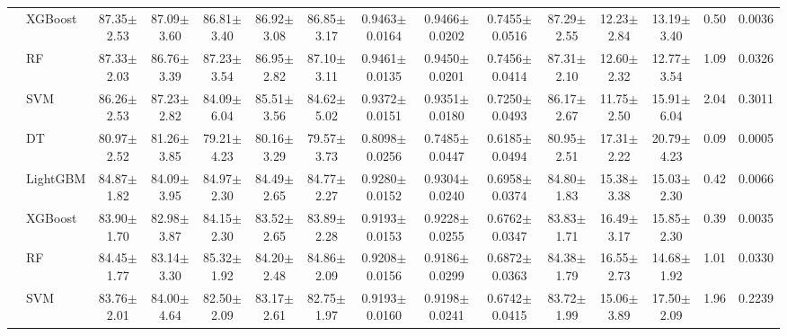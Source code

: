 \begin{tabular}{@{}llccccccccccccc@{}}
 & XGBoost & 87.35{\tiny$\pm$2.53} & 87.09{\tiny$\pm$3.60} & 86.81{\tiny$\pm$3.40} & 86.92{\tiny$\pm$3.08} & 86.85{\tiny$\pm$3.17} & 0.9463{\tiny$\pm$0.0164} & 0.9466{\tiny$\pm$0.0202} & 0.7455{\tiny$\pm$0.0516} & 87.29{\tiny$\pm$2.55} & 12.23{\tiny$\pm$2.84} & 13.19{\tiny$\pm$3.40} & 0.50 & 0.0036\\
 & RF & 87.33{\tiny$\pm$2.03} & 86.76{\tiny$\pm$3.39} & 87.23{\tiny$\pm$3.54} & 86.95{\tiny$\pm$2.82} & 87.10{\tiny$\pm$3.11} & 0.9461{\tiny$\pm$0.0135} & 0.9450{\tiny$\pm$0.0201} & 0.7456{\tiny$\pm$0.0414} & 87.31{\tiny$\pm$2.10} & 12.60{\tiny$\pm$2.32} & 12.77{\tiny$\pm$3.54} & 1.09 & 0.0326\\
 & SVM & 86.26{\tiny$\pm$2.53} & 87.23{\tiny$\pm$2.82} & 84.09{\tiny$\pm$6.04} & 85.51{\tiny$\pm$3.56} & 84.62{\tiny$\pm$5.02} & 0.9372{\tiny$\pm$0.0151} & 0.9351{\tiny$\pm$0.0180} & 0.7250{\tiny$\pm$0.0493} & 86.17{\tiny$\pm$2.67} & 11.75{\tiny$\pm$2.50} & 15.91{\tiny$\pm$6.04} & 2.04 & 0.3011\\
 & DT & 80.97{\tiny$\pm$2.52} & 81.26{\tiny$\pm$3.85} & 79.21{\tiny$\pm$4.23} & 80.16{\tiny$\pm$3.29} & 79.57{\tiny$\pm$3.73} & 0.8098{\tiny$\pm$0.0256} & 0.7485{\tiny$\pm$0.0447} & 0.6185{\tiny$\pm$0.0494} & 80.95{\tiny$\pm$2.51} & 17.31{\tiny$\pm$2.22} & 20.79{\tiny$\pm$4.23} & 0.09 & 0.0005\\
\midrule
{} & LightGBM & 84.87{\tiny$\pm$1.82} & 84.09{\tiny$\pm$3.95} & 84.97{\tiny$\pm$2.30} & 84.49{\tiny$\pm$2.65} & 84.77{\tiny$\pm$2.27} & 0.9280{\tiny$\pm$0.0152} & 0.9304{\tiny$\pm$0.0240} & 0.6958{\tiny$\pm$0.0374} & 84.80{\tiny$\pm$1.83} & 15.38{\tiny$\pm$3.38} & 15.03{\tiny$\pm$2.30} & 0.42 & 0.0066\\
 & XGBoost & 83.90{\tiny$\pm$1.70} & 82.98{\tiny$\pm$3.87} & 84.15{\tiny$\pm$2.30} & 83.52{\tiny$\pm$2.65} & 83.89{\tiny$\pm$2.28} & 0.9193{\tiny$\pm$0.0153} & 0.9228{\tiny$\pm$0.0255} & 0.6762{\tiny$\pm$0.0347} & 83.83{\tiny$\pm$1.71} & 16.49{\tiny$\pm$3.17} & 15.85{\tiny$\pm$2.30} & 0.39 & 0.0035\\
 & RF & 84.45{\tiny$\pm$1.77} & 83.14{\tiny$\pm$3.30} & 85.32{\tiny$\pm$1.92} & 84.20{\tiny$\pm$2.48} & 84.86{\tiny$\pm$2.09} & 0.9208{\tiny$\pm$0.0156} & 0.9186{\tiny$\pm$0.0299} & 0.6872{\tiny$\pm$0.0363} & 84.38{\tiny$\pm$1.79} & 16.55{\tiny$\pm$2.73} & 14.68{\tiny$\pm$1.92} & 1.01 & 0.0330\\
 & SVM & 83.76{\tiny$\pm$2.01} & 84.00{\tiny$\pm$4.64} & 82.50{\tiny$\pm$2.09} & 83.17{\tiny$\pm$2.61} & 82.75{\tiny$\pm$1.97} & 0.9193{\tiny$\pm$0.0160} & 0.9198{\tiny$\pm$0.0241} & 0.6742{\tiny$\pm$0.0415} & 83.72{\tiny$\pm$1.99} & 15.06{\tiny$\pm$3.89} & 17.50{\tiny$\pm$2.09} & 1.96 & 0.2239\\

\end{tabular}
